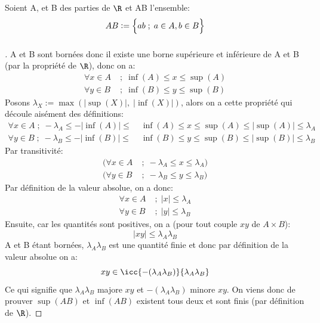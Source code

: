 \subsection[Ensemble produit]{}  
Soient A, et B des parties de \(\R\) et AB l'ensemble:
\[
AB:= \Bigl\{ ab \; ; \; a\in A, b\in  B\Bigl\}
\]
\subsubsection*{}
\begin{proof}[\unskip\nopunct]
A et B sont bornées donc il existe une borne supérieure et inférieure de A et B (par la propriété de \(\R\)), donc on a:
\begin{align*}
   \forall x \in A \; &; \; \inf(A) \leq x \leq \sup(A) \\
   \forall y \in B \; &; \; \inf(B) \leq y \leq \sup(B)
\end{align*}
Posons \(\lambda_X := \max(|\sup(X)|, \;|\inf(X)|)\), alors on a cette propriété qui découle aisément des définitions:
\begin{align*}
   \forall x \in A \; ; \; -\lambda_A \leq - |\inf(A)| \leq & \;\boxed{\inf(A) \leq x \leq \sup(A)} \leq |\sup(A)| \leq \lambda_A \\
   \forall y \in B \; ; \; -\lambda_B \leq - |\inf(B)| \leq & \;\boxed{\inf(B) \leq y \leq \sup(B)} \leq |\sup(B)| \leq \lambda_B
\end{align*}
Par transitivité:
\begin{align*}
   (\forall x \in A \; &; \; -\lambda_A \leq x \leq \lambda_A) \\
   (\forall y \in B \; &; \; -\lambda_B \leq y \leq \lambda_B)
\end{align*}
Par définition de la valeur absolue, on a donc:
\begin{align*}
   \forall x \in A \; &; \; |x| \leq \lambda_A \\
   \forall y \in B \; &; \; |y| \leq \lambda_B
\end{align*}
Ensuite, car les quantités sont positives, on a (pour tout couple \(xy\) de \(A \times B\)):
\[
   |xy| \leq \lambda_A\lambda_B
\]
A et B étant bornées, \(\lambda_A\lambda_B\) est une quantité finie et donc par définition de la valeur absolue on a:
\[
   xy \in \icc{-(\lambda_A\lambda_B)}{\lambda_A\lambda_B}
\]
Ce qui signifie que \(\lambda_A\lambda_B\) majore \(xy\) et \(-(\lambda_A\lambda_B)\) minore \(xy\).\+
On viens donc de prouver \(\sup(AB)\) et \(\inf(AB)\) existent tous deux et sont finis (par définition de \(\R\)).
\end{proof}
